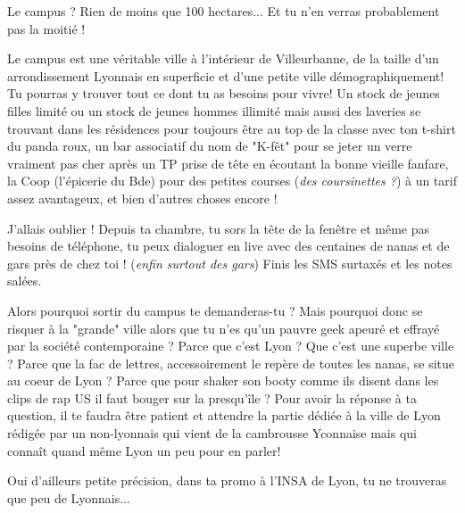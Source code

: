 Le campus ? Rien de moins que 100 hectares... Et tu n'en verras probablement pas
la moitié !

Le campus est une véritable ville à l'intérieur de Villeurbanne, de la taille
d'un arrondissement Lyonnais en superficie et d'une petite ville
démographiquement! Tu pourras y trouver tout ce dont tu as besoins pour vivre!
Un stock de jeunes filles limité ou un stock de jeunes hommes illimité mais
aussi des laveries se trouvant dans les résidences pour toujours être au top de
la classe avec ton t-shirt du panda roux, un bar associatif du nom de "K-fêt"
pour se jeter un verre vraiment pas cher après un TP prise de tête en écoutant
la bonne vieille fanfare, la Coop (l'épicerie du Bde) pour des petites courses
(\emph{des coursinettes ?}) à un tarif assez avantageux, et bien d'autres choses encore
!

J'allais oublier ! Depuis ta chambre, tu sors la tête de la fenêtre et même pas
besoins de téléphone, tu peux dialoguer en live avec des centaines de nanas et
de gars près de chez toi ! (\emph{enfin surtout des gars}) Finis les SMS surtaxés et
les notes salées.

Alors pourquoi sortir du campus te demanderas-tu ? Mais pourquoi donc se risquer
à la "grande" ville alors que tu n'es qu'un pauvre geek apeuré et effrayé par la
société contemporaine ? Parce que c'est Lyon ? Que c'est une superbe ville ?
Parce que la fac de lettres, accessoirement le repère de toutes les nanas, se
situe au coeur de Lyon ? Parce que pour shaker son booty comme ils disent dans
les clips de rap US il faut bouger sur la presqu'île ? Pour avoir la réponse à
ta question, il te faudra être patient et attendre la partie dédiée à la ville
de Lyon rédigée par un non-lyonnais qui vient de la cambrousse Yconnaise mais
qui connaît quand même Lyon un peu pour en parler!

Oui d'ailleurs petite précision, dans ta promo à l'INSA de Lyon, tu ne trouveras
que peu de Lyonnais... 
